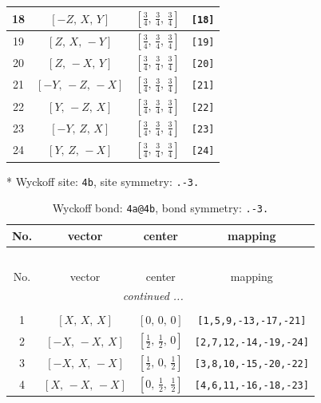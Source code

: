 \documentclass[fleqn,8pt]{jsarticle}
\begin{document}
\begin{longtable}{cccc}
18 & $\left[ - Z,\, X,\, Y \right]$ & $\left[ \frac{3}{4},\, \frac{3}{4},\, \frac{3}{4} \right]$ & {\tt [18]} \\ \hline
19 & $\left[ Z,\, X,\, - Y \right]$ & $\left[ \frac{3}{4},\, \frac{3}{4},\, \frac{3}{4} \right]$ & {\tt [19]} \\ \hline
20 & $\left[ Z,\, - X,\, Y \right]$ & $\left[ \frac{3}{4},\, \frac{3}{4},\, \frac{3}{4} \right]$ & {\tt [20]} \\ \hline
21 & $\left[ - Y,\, - Z,\, - X \right]$ & $\left[ \frac{3}{4},\, \frac{3}{4},\, \frac{3}{4} \right]$ & {\tt [21]} \\ \hline
22 & $\left[ Y,\, - Z,\, X \right]$ & $\left[ \frac{3}{4},\, \frac{3}{4},\, \frac{3}{4} \right]$ & {\tt [22]} \\ \hline
23 & $\left[ - Y,\, Z,\, X \right]$ & $\left[ \frac{3}{4},\, \frac{3}{4},\, \frac{3}{4} \right]$ & {\tt [23]} \\ \hline
24 & $\left[ Y,\, Z,\, - X \right]$ & $\left[ \frac{3}{4},\, \frac{3}{4},\, \frac{3}{4} \right]$ & {\tt [24]} \\
\end{longtable}
* Wyckoff site: {\tt 4b}, site symmetry: {\tt .-3.}
\renewcommand{\arraystretch}{1.2}
\begin{longtable}{cccc}
\caption{Wyckoff bond: {\tt 4a@4b}, bond symmetry: {\tt .-3.}}
 \\
 \hline \hline
No. & vector & center & mapping \\ \hline \endfirsthead

\multicolumn{3}{l}{\tablename\ \thetable{}} \\
 \hline \hline
No. & vector & center & mapping \\ \hline \endhead

 \hline \hline
\multicolumn{3}{r}{\footnotesize\it continued ...} \\ \endfoot

 \hline \hline
\multicolumn{3}{r}{} \\ \endlastfoot

1 & $\left[ X,\, X,\, X \right]$ & $\left[ 0,\, 0,\, 0 \right]$ & {\tt [1,5,9,-13,-17,-21]} \\ \hline
2 & $\left[ - X,\, - X,\, X \right]$ & $\left[ \frac{1}{2},\, \frac{1}{2},\, 0 \right]$ & {\tt [2,7,12,-14,-19,-24]} \\ \hline
3 & $\left[ - X,\, X,\, - X \right]$ & $\left[ \frac{1}{2},\, 0,\, \frac{1}{2} \right]$ & {\tt [3,8,10,-15,-20,-22]} \\ \hline
4 & $\left[ X,\, - X,\, - X \right]$ & $\left[ 0,\, \frac{1}{2},\, \frac{1}{2} \right]$ & {\tt [4,6,11,-16,-18,-23]} \\
\end{longtable}
\end{document}
